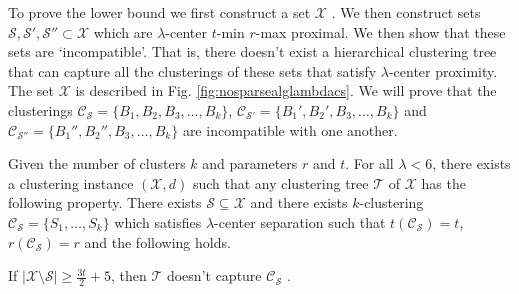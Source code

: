 \documentclass[anon,12pt]{colt2016} %
\newcommand{\mc}{\mathcal}
\begin{document}
To prove the lower bound we first construct a set $\mc X$ . We then construct sets $\mc S, \mc S', \mc S'' \subset \mc X$ which are $\lambda$-center $t$-min $r$-max proximal. We then show that these sets are `incompatible'. That is, there doesn't exist a  hierarchical clustering tree that can capture all the clusterings of these sets that satisfy $\lambda$-center proximity. The set $\mc X$ is described in Fig. \ref{fig:nosparsealglambdacs}. We will prove that the clusterings $\mc C_{\mc S} = \{B_1, B_2, B_3, \ldots, B_k\}$, $\mc C_{\mc S'} = \{B_1', B_2', B_3, \ldots, B_k\}$ and $\mc C_{\mc S''} = \{B_1'', B_2'', B_3, \ldots, B_k\}$ are incompatible with one another.

\begin{theorem}
Given the number of clusters $k$ and parameters $r$ and $t$. For all $\lambda < 6$, there exists a clustering instance $(\mc X , d)$ such that any clustering tree $\mc T$ of $\mc X$ has the following property. There exists $\mc S \subseteq \mc X$ and there exists $k$-clustering $\mc C_{\mc S} = \{S_1, \ldots, S_k\}$ which satisfies $\lambda$-center separation such that $t(\mc C_{\mc S}) = t$, $r(\mc C_{\mc S}) = r$ and the following holds.

If $|\mc X\setminus \mc S|\ge \frac{3t}{2}+5$, then $\mc T$ doesn't capture $\mc C_{\mc S}$ .
\end{theorem}
\end{document}

